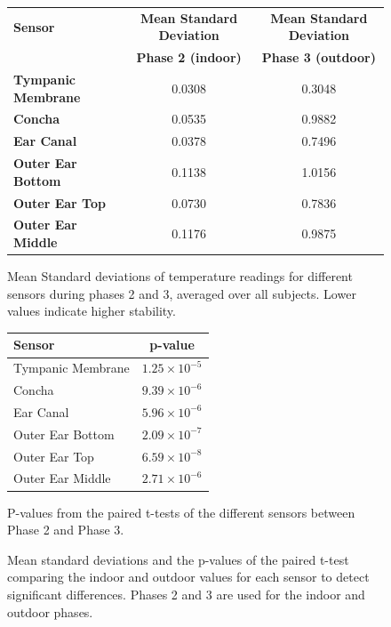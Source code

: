 \begin{figure}[t]
    \centering
    
    \begin{subtable}{\textwidth}
        \centering
        \begin{tabular}{|l|c|c|}
        \hline
        \textbf{Sensor} & \textbf{Mean Standard Deviation} & \textbf{Mean Standard Deviation} \\
        & \textbf{Phase 2 (indoor)} & \textbf{Phase 3 (outdoor)} \\
        \hline
        \textbf{Tympanic Membrane} & 0.0308 & 0.3048 \\
        \textbf{Concha} & 0.0535 & 0.9882 \\
        \textbf{Ear Canal} & 0.0378 & 0.7496 \\
        \textbf{Outer Ear Bottom} & 0.1138 & 1.0156 \\
        \textbf{Outer Ear Top} & 0.0730 & 0.7836 \\
        \textbf{Outer Ear Middle} & 0.1176 & 0.9875 \\
        \hline
        \end{tabular}
        \caption{Mean Standard deviations of temperature readings for different sensors during phases 2 and 3, averaged over all subjects. Lower values indicate higher stability.}
        \label{subsec:Evaluation:Study1:Hypothesis4:std_dev_table}
    \end{subtable}
    
    \vspace{1em} %
    
    \begin{subtable}{\textwidth}
        \centering
        \begin{tabularx}{\textwidth}{|X|c|}
        \hline
        \textbf{Sensor} & \textbf{p-value} \\
        \hline
        Tympanic Membrane & \(1.25 \times 10^{-5}\) \\
        Concha & \(9.39 \times 10^{-6}\) \\
        Ear Canal & \(5.96 \times 10^{-6}\) \\
        Outer Ear Bottom & \(2.09 \times 10^{-7}\) \\
        Outer Ear Top & \(6.59 \times 10^{-8}\) \\
        Outer Ear Middle & \(2.71 \times 10^{-6}\) \\
        \hline
        \end{tabularx}
        \caption{P-values from the paired t-tests of the different sensors between Phase 2 and Phase 3.}
        \label{subsec:Evaluation:Study1:Hypothesis4:pvalues}
    \end{subtable} 
    \caption{Mean standard deviations and the p-values of the paired t-test comparing the indoor and outdoor values for each sensor to detect significant differences. Phases 2 and 3 are used for the indoor and outdoor phases.}
    \label{sec:Evaluation:Study1:Hypothesis4:Summary}
\end{figure}


